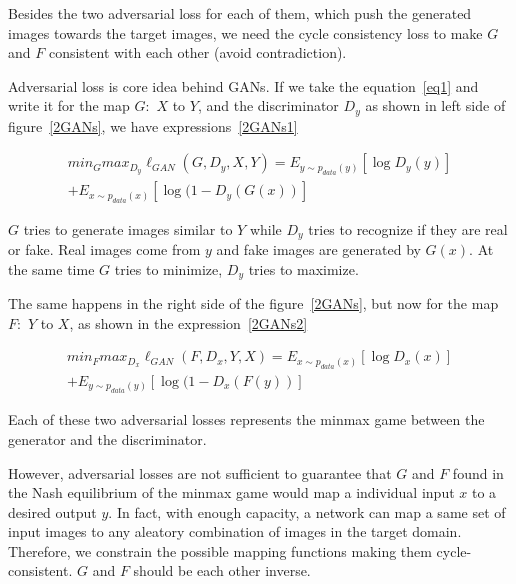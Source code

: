 \documentclass[]{IEEEtran}
\begin{document}
Besides the two adversarial loss for each of them, which push the generated images towards the target images, we need the cycle consistency loss to make $G$ and $F$ consistent with each other (avoid contradiction).\par 
Adversarial loss is core idea behind GANs. If we take the equation~\ref{eq1} and write it for the map $G:$ $X$ to $Y$, and the discriminator ${D}_{y}$ as shown in left side of figure~\ref{2GANs}, we have expressions~\ref{2GANs1}

\begin{equation}
\begin{split}
{ min }_{ G }{ max }_{ { D }_{ y } }\ell _{ GAN }(G,{ D }_{ y },X,Y)={ E }_{ y\sim p_{ { data } }(y) }[\log { D } _{ y }(y)]\\
+{ E }_{ x\sim p_{ data }(x) }[\log  (1-{ D }_{ y }(G(x))]
\label{2GANs1}
\end{split}
\end{equation}

$G$ tries to generate images similar to $Y$ while ${D}_{y}$ tries to recognize if they are real or fake. Real images come from $y$ and fake images are generated by $G(x)$. At the same time $G$ tries to minimize, ${D}_{y}$ tries to maximize.\par 

The same happens in the right side of the figure~\ref{2GANs}, but now for the map $F:$ $Y$ to $X$, as shown in the expression~\ref{2GANs2}

\begin{equation}
\begin{split}
{ min }_{ F }{ max }_{ { D }_{ x } }\ell _{ GAN }(F,{ D }_{ x },Y,X)={ E }_{ x\sim p_{ { data } }(x) }[\log { D } _{ x }(x)]\\
+{ E }_{ y\sim p_{ data }(y) }[\log  (1-{ D }_{ x }(F(y))]
\label{2GANs2}
\end{split}
\end{equation}

Each of these two adversarial losses represents the minmax game between the generator and the discriminator. \par
However, adversarial losses are not sufficient to guarantee that $G$ and $F$ found in the Nash equilibrium of the minmax game would map a individual input $x$ to a desired output $y$. In fact, with enough capacity, a network can map a same set of input images to any aleatory combination of images in the target domain. Therefore, we constrain the possible mapping functions making them cycle-consistent. $G$ and $F$ should be each other inverse. 
\end{document}
